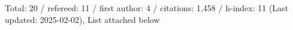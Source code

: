 Total: 20 / refereed: 11 / first author: 4 / citations: 1,458 / h-index: 11 (Last updated: 2025-02-02), List attached below
